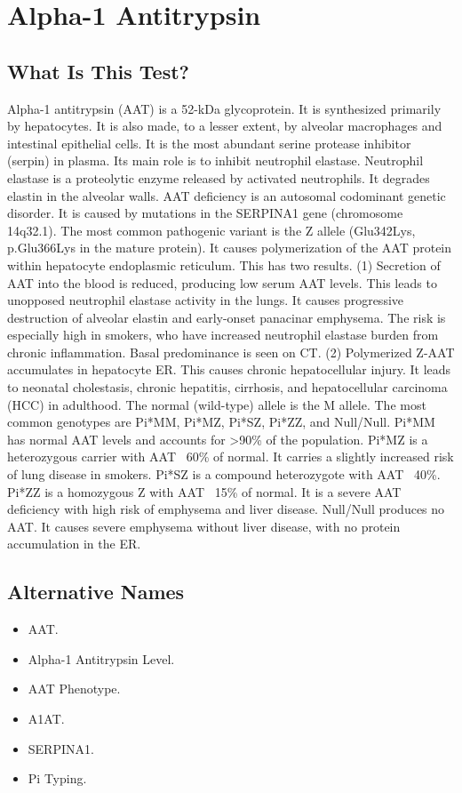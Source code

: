 \chapter{Alpha-1 Antitrypsin}
\section*{What Is This Test?}
Alpha-1 antitrypsin (AAT) is a 52-kDa glycoprotein. It is synthesized primarily by hepatocytes. It is also made, to a lesser extent, by alveolar macrophages and intestinal epithelial cells. It is the most abundant serine protease inhibitor (serpin) in plasma. Its main role is to inhibit neutrophil elastase. Neutrophil elastase is a proteolytic enzyme released by activated neutrophils. It degrades elastin in the alveolar walls. AAT deficiency is an autosomal codominant genetic disorder. It is caused by mutations in the SERPINA1 gene (chromosome 14q32.1). The most common pathogenic variant is the Z allele (Glu342Lys, p.Glu366Lys in the mature protein). It causes polymerization of the AAT protein within hepatocyte endoplasmic reticulum. This has two results. (1) Secretion of AAT into the blood is reduced, producing low serum AAT levels. This leads to unopposed neutrophil elastase activity in the lungs. It causes progressive destruction of alveolar elastin and early-onset panacinar emphysema. The risk is especially high in smokers, who have increased neutrophil elastase burden from chronic inflammation. Basal predominance is seen on CT. (2) Polymerized Z-AAT accumulates in hepatocyte ER. This causes chronic hepatocellular injury. It leads to neonatal cholestasis, chronic hepatitis, cirrhosis, and hepatocellular carcinoma (HCC) in adulthood. The normal (wild-type) allele is the M allele. The most common genotypes are Pi*MM, Pi*MZ, Pi*SZ, Pi*ZZ, and Null/Null. Pi*MM has normal AAT levels and accounts for >90\% of the population. Pi*MZ is a heterozygous carrier with AAT ~60\% of normal. It carries a slightly increased risk of lung disease in smokers. Pi*SZ is a compound heterozygote with AAT ~40\%. Pi*ZZ is a homozygous Z with AAT ~15\% of normal. It is a severe AAT deficiency with high risk of emphysema and liver disease. Null/Null produces no AAT. It causes severe emphysema without liver disease, with no protein accumulation in the ER.
\section*{Alternative Names}
\begin{itemize}
  \item AAT.
  \item Alpha-1 Antitrypsin Level.
  \item AAT Phenotype.
  \item A1AT.
  \item SERPINA1.
  \item Pi Typing.
\end{itemize}
